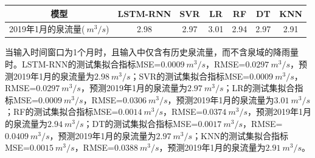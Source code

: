 \begin{table}[!htbp]
  \centering
  \label{tab:spr_pre_only_out_1}
  \footnotesize
  \renewcommand{\arraystretch}{1}
  \begin{tabular}{ccccccc}
    \toprule
    模型 & LSTM-RNN & SVR & LR & RF & DT & KNN\\
    \midrule 
    2019年1月的泉流量($\SI{}{m^{3}/s}$) & 2.98 & 2.97 & 3.01 & 2.94 & 2.97 & 2.91 \\
    \bottomrule
  \end{tabular}
\end{table}

当输入时间窗口为1个月时，且输入中仅含有历史泉流量，而不含泉域的降雨量时。LSTM-RNN的测试集拟合指标MSE=$\SI{0.0009}{m^{3}/s}$，RMSE=$\SI{0.0297}{m^{3}/s}$，预测2019年1月的泉流量为$\SI{2.98}{m^{3}/s}$；SVR的测试集拟合指标MSE=$\SI{0.0009}{m^{3}/s}$，RMSE=$\SI{0.0297}{m^{3}/s}$，预测2019年1月的泉流量为$\SI{2.97}{m^{3}/s}$；LR的测试集拟合指标MSE=$\SI{0.0009}{m^{3}/s}$，RMSE=$\SI{0.0306}{m^{3}/s}$，预测2019年1月的泉流量为$\SI{3.01}{m^{3}/s}$；RF的测试集拟合指标MSE=$\SI{0.0014}{m^{3}/s}$，RMSE=$\SI{0.0374}{m^{3}/s}$，预测2019年1月的泉流量为$\SI{2.94}{m^{3}/s}$；DT的测试集拟合指标MSE=$\SI{0.0017}{m^{3}/s}$，RMSE=$\SI{0.0409}{m^{3}/s}$，预测2019年1月的泉流量为$\SI{2.97}{m^{3}/s}$；KNN的测试集拟合指标MSE=$\SI{0.0015}{m^{3}/s}$，RMSE=$\SI{0.0388}{m^{3}/s}$，预测2019年1月的泉流量为$\SI{2.91}{m^{3}/s}$。


